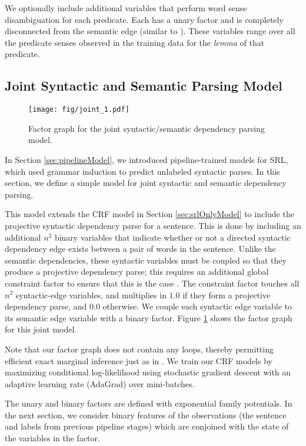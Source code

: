\documentclass[11pt]{article}
\begin{document}
We optionally include additional variables that perform
word sense disambiguation for each predicate. Each has a
unary factor and is completely disconnected from the semantic edge
(similar to ). 
These variables range over all the predicate senses observed in
the training data for the \emph{lemma} of that predicate.

\subsection{Joint Syntactic and Semantic Parsing Model}
\label{sec:jointModel}

\begin{figure}[tb]
  \centering
  \texttt{[image: fig/joint\_1.pdf]}
  \caption{Factor graph for the joint syntactic/semantic dependency
    parsing model.}\label{fig:joint}
\end{figure}

In Section \ref{sec:pipelineModel}, we introduced pipeline-trained models for SRL,
which used grammar induction to predict unlabeled syntactic parses. In
this section, we define a simple model for joint syntactic and
semantic dependency parsing.

This model extends the CRF model in Section \ref{sec:srlOnlyModel} to
include the projective syntactic dependency parse for a sentence. This
is done by including an additional $n^2$ binary variables that
indicate whether or not a directed syntactic dependency edge exists
between a pair of words in the sentence. Unlike the semantic
dependencies, these syntactic variables must be coupled so that they
produce a projective dependency parse; this requires an additional
global constraint factor to ensure that this is the case
\cite{smith_eisner_2008_bp}. The constraint factor touches all $n^2$
syntactic-edge variables, and multiplies in $1.0$ if they form a
projective dependency parse, and $0.0$ otherwise. 
We couple each syntactic edge variable
to its semantic edge variable with a binary factor.
Figure \ref{fig:joint} shows the factor graph for this joint model.

Note that our factor graph does not contain any loops, thereby
permitting efficient exact marginal inference just as in
.
We train our CRF models by maximizing conditional log-likelihood
 using stochastic gradient descent with an adaptive
learning rate (AdaGrad) \cite{duchi_adaptive_2011} over mini-batches.

The unary and binary factors are defined with exponential family
potentials. In the next section, we consider binary features of the
observations (the sentence and labels from previous pipeline stages)
which are conjoined with the state of the variables in the factor.
\end{document}
